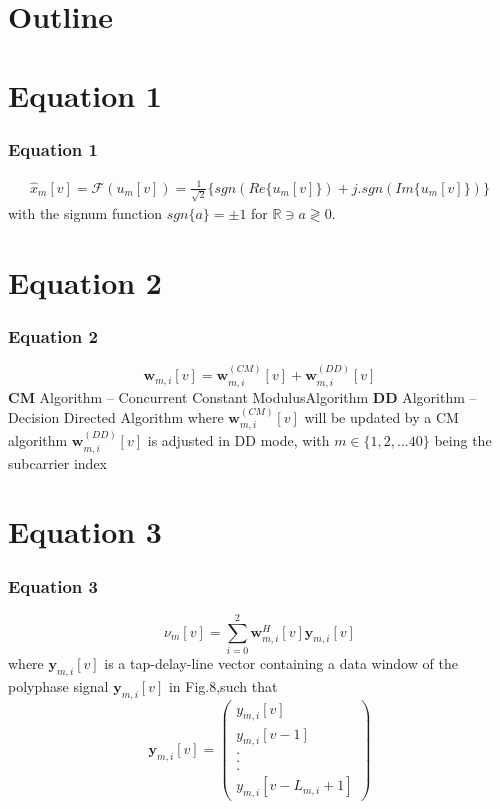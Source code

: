 \documentclass{beamer}
\theoremstyle{remark}
\newcommand{\myvec}[1]{\ensuremath{\begin{pmatrix}#1\end{pmatrix}}}
\let\vec\mathbf
\begin{document}
\section*{Outline}
\begin{frame}
\tableofcontents
\end{frame}

\section{Equation 1}
\begin{frame}
\frametitle{Equation 1}
\begin{align*}
 \hat{x}_m[v] ={\mathcal{F}}(u_m[v])=\frac{1}{\sqrt{2}}\{sgn(Re\{u_m[v]\}) +         j.sgn(Im\{u_m[v]\})\}
\end{align*}
\newline
with the signum function $sgn\{a\} = \pm{1}$ for $\mathbb{R} \ni a \gtrless 0.$ 
\end{frame}
 
\section{Equation 2}
\begin{frame}
\frametitle{Equation 2}
 \begin{equation*}
 \vec{w}_{m,i}[v] = \vec{w}^{(CM)}_{m,i}[v] + \vec{w}^{(DD)}_{m,i}[v]
 \end{equation*}
 $\vec{CM}$ Algorithm -- Concurrent Constant ModulusAlgorithm
 \newline
 $\vec{DD}$ Algorithm -- Decision Directed Algorithm
 \newline
 \newline
 where $\vec{w}^{(CM)}_{m,i}[v]$ will be updated by a CM algorithm
 \newline
 $\vec{w}^{(DD)}_{m,i}[v]$ is adjusted in DD mode, with $m \in \{1, 2, . . . 40\}$
being the subcarrier index
 \end{frame}
 

\section{Equation 3}
\begin{frame}
\frametitle{Equation 3}
 \begin{equation*}
 \nu_m[v] =\sum_{i=0}^{2}\vec{w}^{H}_{m,i}[v] \vec{y}_{m,i}[v]
 \end{equation*}
where $\vec{y}_{m,i}[v]$ is a tap-delay-line vector containing a data
window of the polyphase signal $\vec{y}_{m,i}[v]$ in Fig.8,such that
\begin{equation*}
\vec{y}_{m,i}[v] = \myvec{y_{m,i}[v]\\y_{m,i}[v -1]\\.\\.\\.\\y_{m,i}[v- L_{m,i} + 1]}
\end{equation*}
 \end{frame}
 
\end{document}
